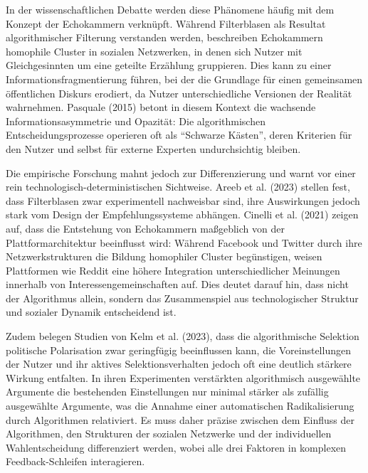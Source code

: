 In der wissenschaftlichen Debatte werden diese Phänomene häufig mit dem Konzept der Echokammern verknüpft. Während Filterblasen als Resultat algorithmischer Filterung verstanden werden, beschreiben Echokammern homophile Cluster in sozialen Netzwerken, in denen sich Nutzer mit Gleichgesinnten um eine geteilte Erzählung gruppieren. Dies kann zu einer Informationsfragmentierung führen, bei der die Grundlage für einen gemeinsamen öffentlichen Diskurs erodiert, da Nutzer unterschiedliche Versionen der Realität wahrnehmen. Pasquale (2015) betont in diesem Kontext die wachsende Informationsasymmetrie und Opazität: Die algorithmischen Entscheidungsprozesse operieren oft als \enquote{Schwarze Kästen}, deren Kriterien für den Nutzer und selbst für externe Experten undurchsichtig bleiben.

Die empirische Forschung mahnt jedoch zur Differenzierung und warnt vor einer rein technologisch-deterministischen Sichtweise. Areeb et al. (2023) stellen fest, dass Filterblasen zwar experimentell nachweisbar sind, ihre Auswirkungen jedoch stark vom Design der Empfehlungssysteme abhängen. Cinelli et al. (2021) zeigen auf, dass die Entstehung von Echokammern maßgeblich von der Plattformarchitektur beeinflusst wird: Während Facebook und Twitter durch ihre Netzwerkstrukturen die Bildung homophiler Cluster begünstigen, weisen Plattformen wie Reddit eine höhere Integration unterschiedlicher Meinungen innerhalb von Interessengemeinschaften auf. Dies deutet darauf hin, dass nicht der Algorithmus allein, sondern das Zusammenspiel aus technologischer Struktur und sozialer Dynamik entscheidend ist.

Zudem belegen Studien von Kelm et al. (2023), dass die algorithmische Selektion politische Polarisation zwar geringfügig beeinflussen kann, die Voreinstellungen der Nutzer und ihr aktives Selektionsverhalten jedoch oft eine deutlich stärkere Wirkung entfalten. In ihren Experimenten verstärkten algorithmisch ausgewählte Argumente die bestehenden Einstellungen nur minimal stärker als zufällig ausgewählte Argumente, was die Annahme einer automatischen Radikalisierung durch Algorithmen relativiert. Es muss daher präzise zwischen dem Einfluss der Algorithmen, den Strukturen der sozialen Netzwerke und der individuellen Wahlentscheidung differenziert werden, wobei alle drei Faktoren in komplexen Feedback-Schleifen interagieren.

